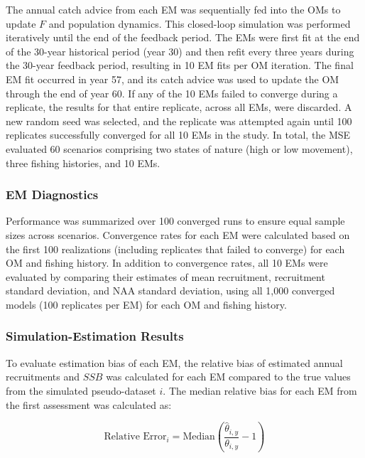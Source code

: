 \documentclass[
  12pt,
]{article}
\begin{document}
The annual catch advice from each EM was sequentially fed into the OMs
to update \(F\) and population dynamics. This closed-loop simulation was
performed iteratively until the end of the feedback period. The EMs were
first fit at the end of the 30-year historical period (year 30) and then
refit every three years during the 30-year feedback period, resulting in
10 EM fits per OM iteration. The final EM fit occurred in year 57, and
its catch advice was used to update the OM through the end of year 60.
If any of the 10 EMs failed to converge during a replicate, the results
for that entire replicate, across all EMs, were discarded. A new random
seed was selected, and the replicate was attempted again until 100
replicates successfully converged for all 10 EMs in the study. In total,
the MSE evaluated 60 scenarios comprising two states of nature (high or
low movement), three fishing histories, and 10 EMs.

\hypertarget{em-diagnostics}{%
\subsubsection{EM Diagnostics}\label{em-diagnostics}}

Performance was summarized over 100 converged runs to ensure equal
sample sizes across scenarios. Convergence rates for each EM were
calculated based on the first 100 realizations (including replicates
that failed to converge) for each OM and fishing history. In addition to
convergence rates, all 10 EMs were evaluated by comparing their
estimates of mean recruitment, recruitment standard deviation, and NAA
standard deviation, using all 1,000 converged models (100 replicates per
EM) for each OM and fishing history.

\hypertarget{simulation-estimation-results}{%
\subsubsection{Simulation-Estimation
Results}\label{simulation-estimation-results}}

To evaluate estimation bias of each EM, the relative bias of estimated
annual recruitments and \(SSB\) was calculated for each EM compared to
the true values from the simulated pseudo-dataset \(i\). The median
relative bias for each EM from the first assessment was calculated as:

\begin{equation}
\text{Relative Error}_{i} = \text{Median} \left( \frac{\hat{\theta}_{i,y}}{\theta_{i,y}} - 1 \right)
\end{equation}
\end{document}

